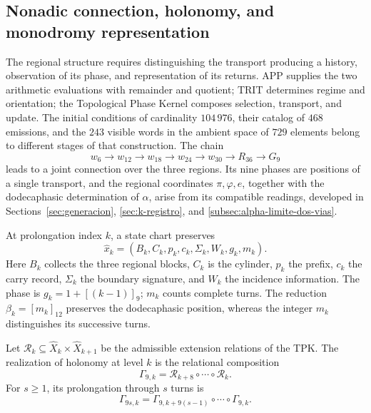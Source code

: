 \subsection{Nonadic connection, holonomy, and monodromy representation}
\label{mono-ampl:conexion}

The regional structure requires distinguishing the transport producing a
history, observation of its phase, and representation of its returns.
APP supplies the two arithmetic evaluations with remainder and quotient; TRIT
determines regime and orientation; the Topological Phase Kernel composes
selection, transport, and update. The initial conditions of
cardinality \(104\,976\), their catalog of \(468\) emissions, and the \(243\)
visible words in the ambient space of \(729\) elements belong to different
stages of that construction. The chain
\[
 w_6\longrightarrow w_{12}\longrightarrow w_{18}
 \longrightarrow w_{24}\longrightarrow w_{30}
 \longrightarrow R_{36}\longrightarrow G_9
\]
leads to a joint connection over the three regions. Its nine phases
are positions of a single transport, and the regional coordinates
\(\pi,\varphi,e\), together with the dodecaphasic determination of \(\alpha\),
arise from its compatible readings, developed in
Sections~\ref{sec:generacion}, \ref{sec:k-registro}, and
\ref{subsec:alpha-limite-dos-vias}.

At prolongation index \(k\), a state chart preserves
\[
 \widehat x_k=(B_k,C_k,p_k,c_k,\Sigma_k,W_k,g_k,m_k).
\]
Here \(B_k\) collects the three regional blocks, \(C_k\) is the cylinder,
\(p_k\) the prefix, \(c_k\) the carry record, \(\Sigma_k\) the boundary
signature, and \(W_k\) the incidence information. The phase is
\(g_k=1+[(k-1)]_9\); \(m_k\) counts complete turns. The reduction
\(\beta_k=[m_k]_{12}\) preserves the dodecaphasic position, whereas the
integer \(m_k\) distinguishes its successive turns.

\begin{definition}
\label{mono-ampl:def-vuelta}
Let \(\mathcal R_k\subseteq\widehat X_k\times\widehat X_{k+1}\)
be the admissible extension relations of the TPK. The realization of
holonomy at level \(k\) is the relational composition
\[
 \Gamma_{9,k}=\mathcal R_{k+8}\circ\cdots\circ\mathcal R_k.
\]
For \(s\geq1\), its prolongation through \(s\) turns is
\[
 \Gamma_{9s,k}=
 \Gamma_{9,k+9(s-1)}\circ\cdots\circ\Gamma_{9,k}.
\]
\end{definition}

